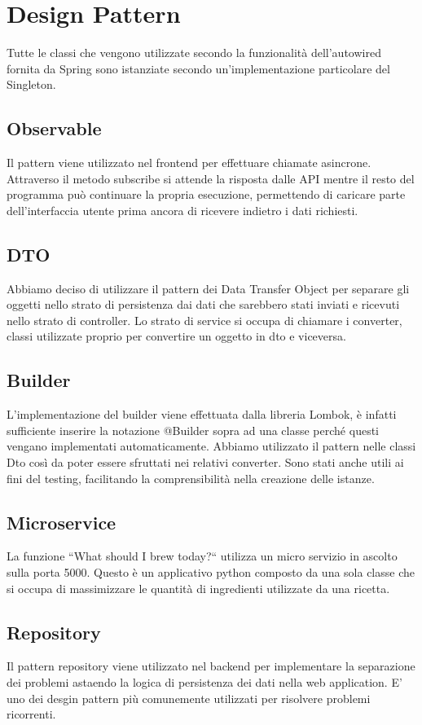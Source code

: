 \documentclass{article}
\begin{document}
\section{Design Pattern}
Tutte le classi che vengono utilizzate secondo la funzionalità dell’autowired fornita da Spring sono istanziate secondo un’implementazione particolare del Singleton.\\
\subsection{Observable}
Il pattern viene utilizzato nel frontend per effettuare chiamate asincrone. Attraverso il metodo subscribe si attende la risposta dalle API mentre il resto del programma può continuare la propria esecuzione, permettendo di caricare parte dell’interfaccia utente prima ancora di ricevere indietro i dati richiesti.
\subsection{DTO}
Abbiamo deciso di utilizzare il pattern dei Data Transfer Object per separare gli oggetti nello strato di persistenza dai dati che sarebbero stati inviati e ricevuti nello strato di controller. Lo strato di service si occupa di chiamare i converter, classi utilizzate proprio per convertire un oggetto in dto e viceversa.
\subsection{Builder}
L’implementazione del builder viene effettuata dalla libreria Lombok, è infatti sufficiente inserire la notazione @Builder sopra ad una classe perché questi vengano implementati automaticamente. Abbiamo utilizzato il pattern nelle classi Dto così da poter essere sfruttati nei relativi converter. Sono stati anche utili ai fini del testing, facilitando la comprensibilità nella creazione delle istanze.
\subsection{Microservice}
La funzione “What should I brew today?“ utilizza un micro servizio in ascolto sulla porta 5000. Questo è un applicativo python composto da una sola classe che si occupa di massimizzare le quantità di ingredienti utilizzate da una ricetta.
\subsection{Repository} 
Il pattern repository viene utilizzato nel backend per implementare la separazione dei problemi astaendo la logica di persistenza dei dati nella web application. E' uno dei desgin pattern più comunemente utilizzati per risolvere problemi ricorrenti.
\clearpage
\end{document}
